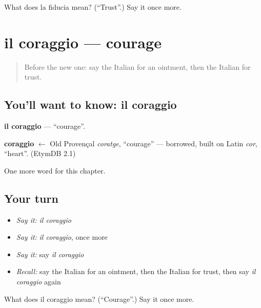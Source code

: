 \begin{tcolorbox}[breakable,colback=teal!4,colframe=teal!35!black,title={Before you move on}]
What does la fiducia mean? (\textquotedblleft{}Trust\textquotedblright{}.) Say it once more.
\end{tcolorbox}
\section[il coraggio]{il coraggio — courage}

\label{lesson:IT-C216-coraggio}



\begin{quote}
Before the new one: say the Italian for an ointment, then the Italian for trust.
\end{quote}

\subsection*{You'll want to know: il coraggio}
\textbf{il coraggio} — \textquotedblleft{}courage\textquotedblright{}.

\begin{cousinweb}
\textbf{coraggio} $\leftarrow$ Old Provençal \emph{coratge}, \textquotedblleft{}courage\textquotedblright{} — borrowed, built on Latin \emph{cor}, \textquotedblleft{}heart\textquotedblright{}. (EtymDB 2.1)
\end{cousinweb}

\begin{grammarlens}[title={What you've built}]
One more word for this chapter.
\end{grammarlens}

\subsection*{Your turn}
\begin{itemize}
\raggedright
  \item \emph{Say it:} \emph{il coraggio}
  \item \emph{Say it:} \emph{il coraggio}, once more
  \item \emph{Say it:} say \emph{il coraggio}
  \item \emph{Recall:} say the Italian for an ointment, then the Italian for trust, then say \emph{il coraggio} again
\end{itemize}

\begin{tcolorbox}[breakable,colback=teal!4,colframe=teal!35!black,title={Before you move on}]
What does il coraggio mean? (\textquotedblleft{}Courage\textquotedblright{}.) Say it once more.
\end{tcolorbox}
